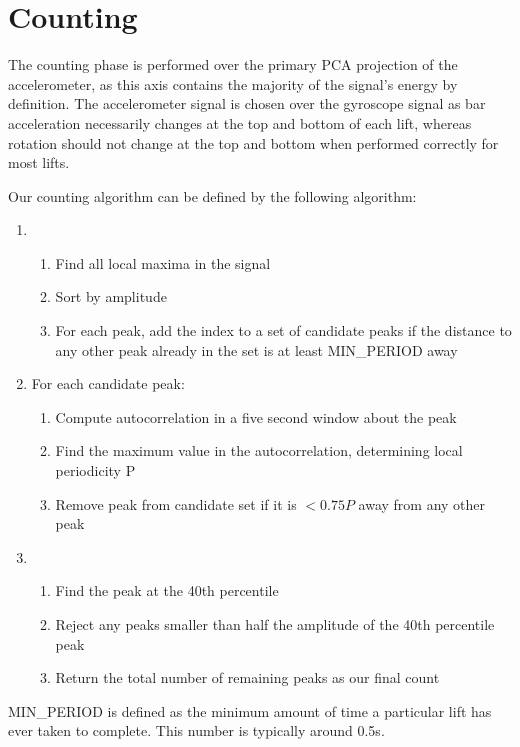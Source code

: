\section{Counting}

The counting phase is performed over the primary PCA projection of the accelerometer, as this axis contains the majority of the signal's energy by definition. The accelerometer signal is chosen over the gyroscope signal as bar acceleration necessarily changes at the top and bottom of each lift, whereas rotation should not change at the top and bottom when performed correctly for most lifts.

Our counting algorithm can be defined by the following algorithm: 
\begin{enumerate}
    \item 
    \begin{enumerate}
        \item Find all local maxima in the signal
        \item Sort by amplitude
        \item For each peak, add the index to a set of candidate peaks if the distance to any other peak already in the set is at least MIN\_PERIOD away
    \end{enumerate}
    \item For each candidate peak:
    \begin{enumerate}
        \item Compute autocorrelation in a five second window about the peak
        \item Find the maximum value in the autocorrelation, determining local periodicity P
        \item Remove peak from candidate set if it is $<0.75P$ away from any other peak
    \end{enumerate}
    \item 
    \begin{enumerate}
        \item Find the peak at the 40th percentile
        \item Reject any peaks smaller than half the amplitude of the 40th percentile peak
        \item Return the total number of remaining peaks as our final count
    \end{enumerate}
\end{enumerate}

MIN\_PERIOD is defined as the minimum amount of time a particular lift has ever taken to complete. This number is typically around 0.5s. 


